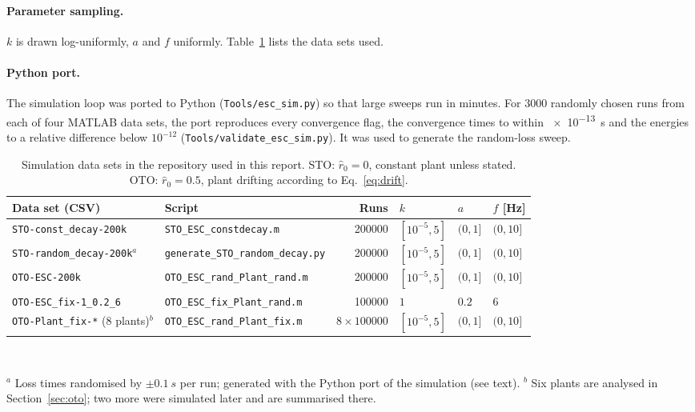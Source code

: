 \documentclass[11pt,a4paper]{article}
\newcommand{\rhat}{\hat r}
\begin{document}
\paragraph{Parameter sampling.} $k$ is drawn log-uniformly, $a$ and $f$ uniformly. Table~\ref{tab:datasets} lists the data sets used.

\paragraph{Python port.} The simulation loop was ported to Python (\texttt{Tools/esc\_sim.py}) so that large sweeps run in minutes. For \num{3000} randomly chosen runs from each of four MATLAB data sets, the port reproduces every convergence flag, the convergence times to within \SI{e-13}{s} and the energies to a relative difference below $10^{-12}$ (\texttt{Tools/validate\_esc\_sim.py}). It was used to generate the random-loss sweep.

\begin{table}[t]
  \centering
  \small
  \caption{Simulation data sets in the repository used in this report. STO: $\rhat_0=0$, constant plant unless stated. OTO: $\rhat_0=0.5$, plant drifting according to Eq.~\eqref{eq:drift}.}
  \label{tab:datasets}
  \begin{tabular}{@{}llrlll@{}}
    \toprule
    Data set (CSV) & Script & Runs & $k$ & $a$ & $f$ [Hz] \\
    \midrule
    \texttt{STO-const\_decay-200k} & \texttt{STO\_ESC\_constdecay.m} & \num{200000} & $[10^{-5},5]$ & $(0,1]$ & $(0,10]$ \\
    \texttt{STO-random\_decay-200k}$^{a}$ & \texttt{generate\_STO\_random\_decay.py} & \num{200000} & $[10^{-5},5]$ & $(0,1]$ & $(0,10]$ \\
    \texttt{OTO-ESC-200k} & \texttt{OTO\_ESC\_rand\_Plant\_rand.m} & \num{200000} & $[10^{-5},5]$ & $(0,1]$ & $(0,10]$ \\
    \texttt{OTO-ESC\_fix-1\_0.2\_6} & \texttt{OTO\_ESC\_fix\_Plant\_rand.m} & \num{100000} & $1$ & $0.2$ & $6$ \\
    \texttt{OTO-Plant\_fix-*} (8 plants)$^{b}$ & \texttt{OTO\_ESC\_rand\_Plant\_fix.m} & $8\times\num{100000}$ & $[10^{-5},5]$ & $(0,1]$ & $(0,10]$ \\
    \bottomrule
  \end{tabular}\\[0.5ex]
  \raggedright\footnotesize
  $^{a}$ Loss times randomised by $\pm\SI{0.1}{s}$ per run; generated with the Python port of the simulation (see text).\quad
  $^{b}$ Six plants are analysed in Section~\ref{sec:oto}; two more were simulated later and are summarised there.
\end{table}
\end{document}
